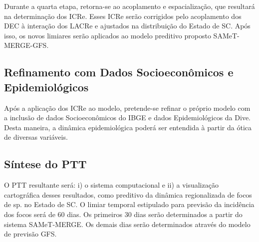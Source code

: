 \indent Durante a quarta etapa, retorna-se ao acoplamento e espacialização, que resultará na determinação dos \acrfull{ICRe}. Esses \acrshort{ICRe} serão corrigidos pelo acoplamento dos \acrshort{DEC} à interação dos \acrshort{LACRe} e ajustados na distribuição do Estado de \acrlong{SC}. Após isso, os novos limiares serão aplicados ao modelo preditivo proposto \acrshort{SAMeT}-\acrshort{MERGE}-\acrshort{GFS}.


\subsection{Refinamento com Dados Socioeconômicos e Epidemiológicos}

\indent Após a aplicação dos \acrshort{ICRe} ao modelo, pretende-se refinar o próprio modelo com a inclusão de dados Socioeconômicos do \acrshort{IBGE} e dados Epidemiológicos da \acrshort{Dive}. Desta maneira, a dinâmica epidemiológica poderá ser entendida à partir da ótica de diversas variáveis.


\subsection{Síntese do \acrfull{PTT}} 

\indent O \acrshort{PTT} resultante será: i) o sistema computacional e ii) a visualização cartográfica desses resultados, como preditivo da dinâmica regionalizada de focos de  sp. no Estado de \acrlong{SC}. O limiar temporal estipulado para previsão da incidência dos focos será de 60 dias. Os primeiros 30 dias serão determinados a partir do sistema \acrshort{SAMeT}-\acrshort{MERGE}. Os demais dias serão determinados através do modelo de previsão \acrshort{GFS}.




